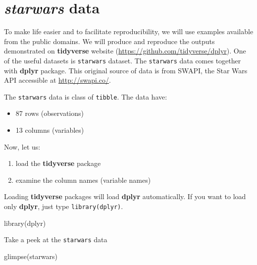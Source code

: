\documentclass[
]{book}
\makeatletter
\newenvironment{Shaded}{\begin{snugshade}}{\end{snugshade}}
\newcommand{\FunctionTok}[1]{\textcolor[rgb]{0,0,0}{#1}}
\newcommand{\NormalTok}[1]{#1}
\providecommand{\tightlist}{%
  \setlength{\itemsep}{0pt}\setlength{\parskip}{0pt}}
\newenvironment{kframe}{%
\medskip{}
\setlength{\fboxsep}{.8em}
 \def\at@end@of@kframe{}%
 \ifinner\ifhmode%
  \def\at@end@of@kframe{\end{minipage}}%
  \begin{minipage}{\columnwidth}%
 \fi\fi%
 \def\FrameCommand##1{\hskip\@totalleftmargin \hskip-\fboxsep
 \colorbox{shadecolor}{##1}\hskip-\fboxsep
     \hskip-\linewidth \hskip-\@totalleftmargin \hskip\columnwidth}%
 \MakeFramed {\advance\hsize-\width
   \@totalleftmargin\z@ \linewidth\hsize
   \@setminipage}}%
 {\par\unskip\endMakeFramed%
 \at@end@of@kframe}
\renewenvironment{Shaded}{\begin{kframe}}{\end{kframe}}
\makeatother
\begin{document}
\hypertarget{starwars-data}{%
\section{\texorpdfstring{\emph{starwars} data}{starwars data}}\label{starwars-data}}

To make life easier and to facilitate reproducibility, we will use examples available from the public domains. We will produce and reproduce the outputs demonstrated on \textbf{tidyverse} website (\url{https://github.com/tidyverse/dplyr}). One of the useful datasets is \texttt{starwars} dataset. The \texttt{starwars} data comes together with \textbf{dplyr} package. This original source of data is from SWAPI, the Star Wars API accessible at \url{http://swapi.co/}.

The \texttt{starwars} data is class of \texttt{tibble}. The data have:

\begin{itemize}
\tightlist
\item
  87 rows (observations)
\item
  13 columns (variables)
\end{itemize}

Now, let us:

\begin{enumerate}
\def\labelenumi{\arabic{enumi}.}
\tightlist
\item
  load the \textbf{tidyverse} package
\item
  examine the column names (variable names)
\end{enumerate}

Loading \textbf{tidyverse} packages will load \textbf{dplyr} automatically. If you want to load only \textbf{dplyr}, just type \texttt{library(dplyr)}.

\begin{Shaded}
\begin{Highlighting}[]
\FunctionTok{library}\NormalTok{(dplyr)}
\end{Highlighting}
\end{Shaded}

Take a peek at the \texttt{starwars} data

\begin{Shaded}
\begin{Highlighting}[]
\FunctionTok{glimpse}\NormalTok{(starwars)}
\end{Highlighting}
\end{Shaded}
\end{document}
